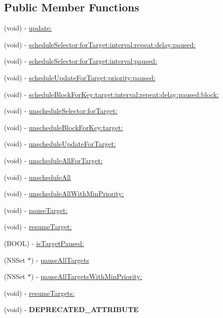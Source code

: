 \subsection*{Public Member Functions}
\begin{DoxyCompactItemize}
\item 
(void) -\/ \hyperlink{class_c_c_scheduler_aea4340dae5ad2178a9362a4cb2d4c5bd}{update\-:}
\item 
(void) -\/ \hyperlink{class_c_c_scheduler_a5c8d8f28a0c5e59256de5795a4ed29ef}{schedule\-Selector\-:for\-Target\-:interval\-:repeat\-:delay\-:paused\-:}
\item 
(void) -\/ \hyperlink{class_c_c_scheduler_a58685c484a66f1f6f30a6720cc92ebd0}{schedule\-Selector\-:for\-Target\-:interval\-:paused\-:}
\item 
(void) -\/ \hyperlink{class_c_c_scheduler_a215c93c8d349ef0e05ccb5c4a3659d18}{schedule\-Update\-For\-Target\-:priority\-:paused\-:}
\item 
(void) -\/ \hyperlink{class_c_c_scheduler_ad37c13d97a269598543ed3587fe23d8f}{schedule\-Block\-For\-Key\-:target\-:interval\-:repeat\-:delay\-:paused\-:block\-:}
\item 
(void) -\/ \hyperlink{class_c_c_scheduler_a714490ea280354963cd5dafb6cf5f02e}{unschedule\-Selector\-:for\-Target\-:}
\item 
(void) -\/ \hyperlink{class_c_c_scheduler_a6fb2a1e58e13f02ee13e6650c7a1e63c}{unschedule\-Block\-For\-Key\-:target\-:}
\item 
(void) -\/ \hyperlink{class_c_c_scheduler_af9189c31ec6214811a144d330e75bd16}{unschedule\-Update\-For\-Target\-:}
\item 
(void) -\/ \hyperlink{class_c_c_scheduler_ab57a6316afea5ccc4f674203b2119f3e}{unschedule\-All\-For\-Target\-:}
\item 
(void) -\/ \hyperlink{class_c_c_scheduler_a491d9b4f2b65668c82ec6b55726b39e6}{unschedule\-All}
\item 
(void) -\/ \hyperlink{class_c_c_scheduler_a2ad1d8d118509a718a4aff0e1a82536b}{unschedule\-All\-With\-Min\-Priority\-:}
\item 
(void) -\/ \hyperlink{class_c_c_scheduler_a212ecf962efef408b95a2cffba8a0ba7}{pause\-Target\-:}
\item 
(void) -\/ \hyperlink{class_c_c_scheduler_a45bb79fed502ce7001c733b3355fb3e6}{resume\-Target\-:}
\item 
(B\-O\-O\-L) -\/ \hyperlink{class_c_c_scheduler_abbfddc0e81ebb2bee86281bb85aec1dd}{is\-Target\-Paused\-:}
\item 
(N\-S\-Set $\ast$) -\/ \hyperlink{class_c_c_scheduler_a2842338061b84d5fba4d3fcf1bd0e993}{pause\-All\-Targets}
\item 
(N\-S\-Set $\ast$) -\/ \hyperlink{class_c_c_scheduler_aba4caf0e71068c70928a9b33555cfb43}{pause\-All\-Targets\-With\-Min\-Priority\-:}
\item 
(void) -\/ \hyperlink{class_c_c_scheduler_a8f6a77d8b666d437120c54e7683a8afe}{resume\-Targets\-:}
\item 
\hypertarget{class_c_c_scheduler_a1ef27ee759deae171ee6ea14e351ecb1}{(void) -\/ {\bfseries D\-E\-P\-R\-E\-C\-A\-T\-E\-D\-\_\-\-A\-T\-T\-R\-I\-B\-U\-T\-E}}\label{class_c_c_scheduler_a1ef27ee759deae171ee6ea14e351ecb1}


\end{DoxyCompactItemize}
